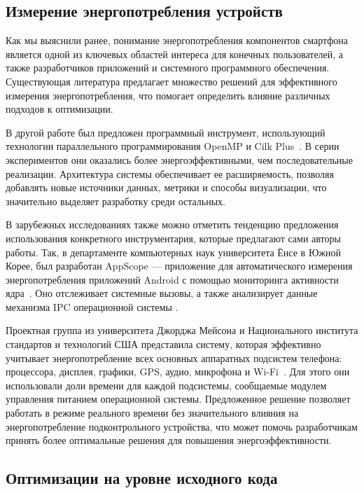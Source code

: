 \documentclass[a4paper,14pt]{extarticle} %
\begin{document}
	\subsection{Измерение энергопотребления устройств}

	Как мы выяснили ранее, понимание энергопотребления компонентов смартфона является одной из ключевых областей интереса для конечных пользователей, а также разработчиков приложений и системного программного обеспечения. Существующая литература предлагает множество решений для эффективного измерения энергопотребления, что помогает определить влияние различных подходов к оптимизации.
	
	В другой работе был предложен программный инструмент, использующий технологии параллельного программирования OpenMP и Cilk Plus~\parencite{калачев2013разработка}. В серии экспериментов они оказались более энергоэффективными, чем последовательные реализации. Архитектура системы обеспечивает ее расширяемость, позволяя добавлять новые источники данных, метрики и способы визуализации, что значительно выделяет разработку среди остальных.
	
	В зарубежных исследованиях также можно отметить тенденцию предложения использования конкретного инструментария, которые предлагают сами авторы работы. Так, в департаменте компьютерных наук университета Ёнсе в Южной Корее, был разработан AppScope --- приложение для автоматического измерения энергопотребления приложений Android с помощью мониторинга активности ядра~\parencite{yoon2012appscope}. Оно отслеживает системные вызовы, а также анализирует данные механизма IPC операционной системы . 
	
	Проектная группа из университета Джорджа Мейсона и Национального института стандартов и технологий США представила систему, которая эффективно учитывает энергопотребление всех основных аппаратных подсистем телефона: процессора, дисплея, графики, GPS, аудио, микрофона и Wi-Fi~\parencite{murmuria2012mobile}. Для этого они использовали доли времени для каждой подсистемы, сообщаемые модулем управления питанием операционной системы. Предложенное решение позволяет работать в режиме реального времени без значительного влияния на энергопотребление подконтрольного устройства, что может помочь разработчикам принять более оптимальные решения для повышения энергоэффективности.

	\subsection{Оптимизации на уровне исходного кода}
\end{document}
